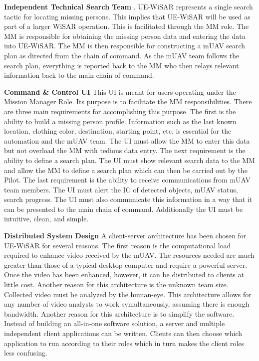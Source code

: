 \documentclass[12pt]{IEEEtran}
\begin{document}
\textbf{Independent Technical Search Team}
\cite{adams2009cognitive}.
UE-WiSAR represents a single search tactic for locating missing persons.  This
implies that UE-WiSAR will be used as part of a larger WiSAR operation.  This is
facilitated through the MM role.
The MM is responsible for obtaining the missing person data and entering the
data into UE-WiSAR.  The MM is then responsible for constructing a mUAV search
plan as directed from the chain of command.  As the mUAV team follows the
search plan, everything is reported back to the MM who then relays relevant
information back to the main chain of command.

\textbf{Command \& Control UI} This UI is meant for users operating under the
Mission Manager Role.  Its purpose is to facilitate the MM responsibilities. 
There are three main requirements for accomplishing this purpose.  The first is the ability to build a missing person profile. 
Information such as the last known location, clothing color, destination,
starting point, etc. is essential for the automation and the mUAV team. 
The UI must allow the MM to enter this data but not overload the MM with tedious
data entry.  The next requirement is the ability to define a search plan.  The
UI must show relevant search data to the MM and allow the MM to define a search
plan which can then be carried out by the Pilot.  The
last requirement is the ability to receive communications from mUAV team members.  The UI must alert the
IC of detected objects, mUAV status, search progress.  The UI must also
communicate this information in a way that it can be presented to the main chain
of command.  Additionally the UI must be intuitive, clean, and simple.

\textbf{Distributed System Design}  A client-server architecture has been chosen
for UE-WiSAR for several reasons.  The first reason is the computational load
required to enhance video received by the mUAV.  The resources needed are much
greater than those of a typical desktop computer and require a powerful server. 
Once the video has been enhanced, however, it can be distributed to clients at
little cost.  Another reason for this architecture is the unknown team size. 
Collected video must be analyzed by the human-eye.  This architecture allows for
any number of video analysts to work symultaneously, assuming there is enough bandwidth.
Another reason for this architecture is to simplify the software.  Instead of
building an all-in-one software solution, a server and multiple independent
client applications can be written.  Clients can then choose which application
to run according to their roles which in turn makes the client roles less
confusing.
\end{document}
